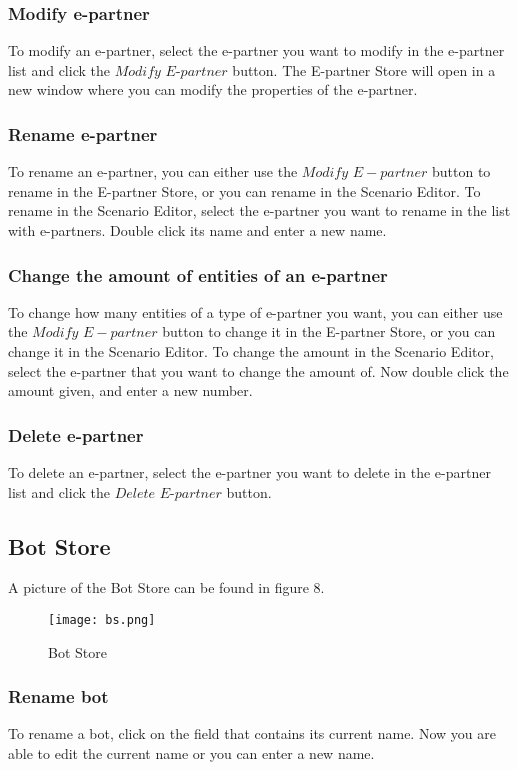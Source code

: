 \documentclass[11pt,a4paper]{article}
\begin{document}
\subsubsection{Modify e-partner}
To modify an e-partner, select the e-partner you want to modify in the e-partner list and click the $Modify$ $E$-$partner$ button. The E-partner Store will open in a new window where you can modify the properties of the e-partner.

\subsubsection{Rename e-partner}
To rename an e-partner, you can either use the $Modify$ $E-partner$ button to rename in the E-partner Store, or you can rename in the Scenario Editor. To rename in the Scenario Editor, select the e-partner you want to rename in the list with e-partners. Double click its name and enter a new name.

\subsubsection{Change the amount of entities of an e-partner}
To change how many entities of a type of e-partner you want, you can either use the $Modify$ $E-partner$ button to change it in the E-partner Store, or you can change it in the Scenario Editor. To change the amount in the Scenario Editor, select the e-partner that you want to change the amount of. Now double click the amount given, and enter a new number.

\subsubsection{Delete e-partner}
To delete an e-partner, select the e-partner you want to delete in the e-partner list and click the $Delete$ $E$-$partner$ button.

\subsection{Bot Store}
A picture of the Bot Store can be found in figure 8.
\begin{figure}[h]
\begin{center}
\texttt{[image: bs.png]}
\end{center}
\caption{Bot Store}
\end{figure}
\subsubsection{Rename bot}
To rename a bot, click on the field that contains its current name. Now you are able to edit the current name or you can enter a new name.
\end{document}
